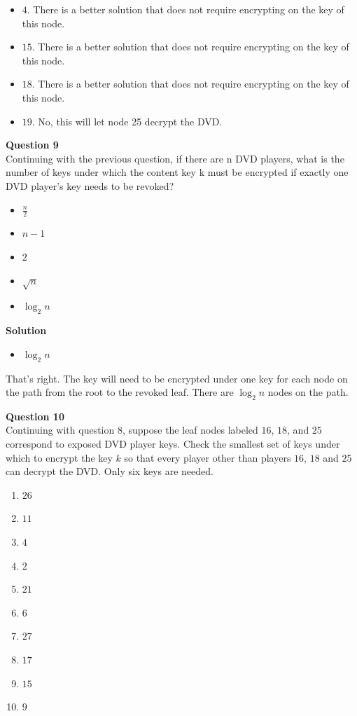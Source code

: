 \documentclass[a4paper,12pt]{article}
\begin{document}
%
\begin{itemize}
\item $4$. There is a better solution that does not require encrypting on the key of this node.
\item $15$. There is a better solution that does not require encrypting on the key of this node.
\item $18$. There is a better solution that does not require encrypting on the key of this node.
\item $19$. No, this will let node 25 decrypt the DVD.
\end{itemize}

\textbf{Question 9} \\

Continuing with the previous question, if there are n DVD players, what is the number of keys under which the content key k must be encrypted if exactly one DVD player's key needs to be revoked?
%
\begin{itemize}
%
\item $\frac{n}{2}$
\item $n - 1$
\item $2$
\item $\sqrt{n}$
\item $\log_{2}{n}$
%
\end{itemize}

\textbf{Solution} 

\begin{itemize}
%
\item $\log_{2}{n}$
%
\end{itemize}
%
That's right. The key will need to be encrypted under one key for each node on the path from the root to the revoked leaf. There are $\log_{2}{n}$ nodes on the path.

\textbf{Question 10}\\

Continuing with question 8, suppose the leaf nodes labeled $16$, $18$, and $25$ correspond to exposed DVD player keys. Check the smallest set of keys under which to encrypt the key $k$ so that every player other than players $16$, $18$ and $25$ can decrypt the DVD. Only six keys are needed.
%
\begin{enumerate}
\item $26$
\item $11$
\item $4$
\item $2$
\item $21$
\item $6$
\item $27$
\item $17$
\item $15$
\item $9$
\end{enumerate}
\end{document}
